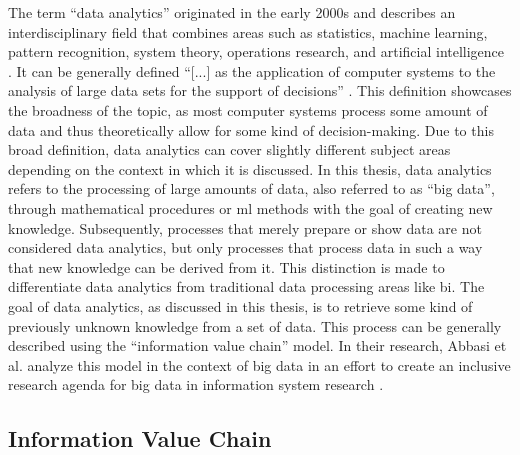 The term \enquote{data analytics} originated in the early 2000s and describes an interdisciplinary field that combines areas such as statistics, machine learning, pattern recognition, system theory, operations research, and artificial intelligence \parencite{Runkler.2020}. It can be generally defined \enquote{[...] as the application of computer systems to the analysis of large data sets for the support of decisions} \parencite{Runkler.2020}. This definition showcases the broadness of the topic, as most computer systems process some amount of data and thus theoretically allow for some kind of decision-making. Due to this broad definition, data analytics can cover slightly different subject areas depending on the context in which it is discussed. In this thesis, data analytics refers to the processing of large amounts of data, also referred to as \enquote{big data}, through mathematical procedures or \ac{ml} methods with the goal of creating new knowledge. Subsequently, processes that merely prepare or show data are not considered data analytics, but only processes that process data in such a way that new knowledge can be derived from it. This distinction is made to differentiate data analytics from traditional data processing areas like \ac{bi}. The goal of data analytics, as discussed in this thesis, is to retrieve some kind of previously unknown knowledge from a set of data. This process can be generally described using the \enquote{information value chain} model. In their research, Abbasi et al. analyze this model in the context of big data in an effort to create an inclusive research agenda for big data in information system research \parencite{Abbasi.2016}.

\subsection{Information Value Chain}
\label{subsec:informationValueChainSubSection}

